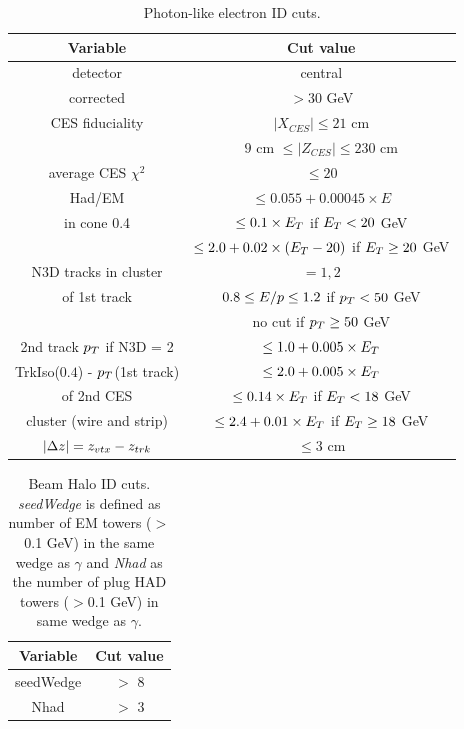 \documentclass[11pt]{article}
\begin{document}
\begin{table}[h!]
		\begin{center}
			\begin{tabular} {|c|c|}
				\hline
				\bf{Variable} 		& \bf{Cut value} 	\\
				\hline
				detector  		  	& central 	\\
				\hline
				corrected \et 	& $ >30 $ GeV \\
				\hline
				CES fiduciality 		& $ |X_{CES}| \leq 21 $ cm \\
								& $ 9 $ cm $ \leq |Z_{CES}| \leq 230 $ cm \\
				\hline
				average CES $ \chi^2 $	&  $ \leq 20 $ \\
				\hline
				Had/EM 		&	$ \leq 0.055 + 0.00045 \times E $ \\
				\hline
				\isoetcorr in cone 0.4	&	$ \leq 0.1 \times \mbox{$E_T$} $ if $ \mbox{$E_T$} < 20 $ GeV \\
									&	$ \leq 2.0 + 0.02 \times (\mbox{$E_T$} -20) $ if $ \mbox{$E_T$} \geq 20 $ GeV \\
				\hline
				N3D tracks in cluster	&	$= 1,2 $ \\
				\hline
				\eoverp of 1st track	& $0.8 \leq \mbox{$E/p$} \leq 1.2 $ if $ \mbox{$p_T$} < 50 $ GeV \\
									& no cut if $ \mbox{$p_T$} \geq 50 $ GeV \\
				\hline
				2nd track $\mbox{$p_T$}$ if N3D = 2	&	$ \leq 1.0 + 0.005 \times \mbox{$E_T$} $ \\
				\hline
				TrkIso($0.4$) - $\mbox{$p_T$}$(1st track) &	$ \leq 2.0 + 0.005 \times \mbox{$E_T$} $ \\
				\hline
				\et of 2nd CES			&	$ \leq 0.14 \times \mbox{$E_T$} $ if $ \mbox{$E_T$} < 18 $ GeV \\
				cluster (wire and strip)		&	$ \leq 2.4 + 0.01 \times \mbox{$E_T$} $ if $ \mbox{$E_T$} \geq 18 $ GeV \\
				\hline
				$|\Delta z| = z_{vtx} \-- z_{trk}$	&	$\leq 3$ cm	\\
				\hline

			\end{tabular}
		\end{center}
	\caption{Photon-like electron ID cuts.}
	\label{tab:pecuts}
\end{table}

\begin{table}[h!]
\begin{center}
\begin{tabular} {|c|c|}
\hline
\bf{Variable} 		& \bf{Cut value} 	\\
\hline
seedWedge  		  	& $>$ 8 	\\
\hline
Nhad 	& $>$ 3\\
\hline
\end{tabular}
\end{center}
\caption{Beam Halo ID cuts. \textit{seedWedge} is defined as number of EM towers (\et$>$0.1 GeV) in the same wedge as $\gamma$ and \textit{Nhad} as the number of plug HAD towers (\et$>$0.1 GeV) in same wedge as $\gamma$.}
\label{tab:halocuts}
\end{table}

\end{document}
